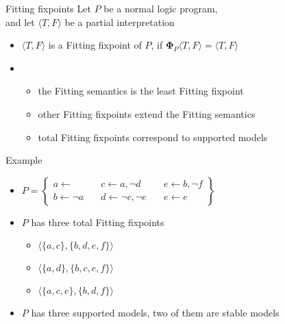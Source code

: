 \begin{frame}{Fitting fixpoints}
  \bigskip
  Let $P$ be a normal logic program,\\ and
  let $\langle T,F \rangle$ be a partial interpretation
  \medskip
  \begin{itemize}
  \item<1->
    $\langle T,F \rangle$ is a \alert{Fitting fixpoint} of $P$,
    if
    ${\mathbf{\Phi}}_P\langle T,F \rangle = \langle T,F \rangle$
  \smallskip
  \item<2-> []
    \begin{itemize}\normalsize
    \item the Fitting semantics is the least Fitting fixpoint
      \smallskip
    \item other Fitting fixpoints extend the Fitting semantics
      \smallskip
    \item total Fitting fixpoints correspond to supported models
    \end{itemize}
  \end{itemize}
\end{frame}
\begin{frame}{Example}
  \bigskip
  \begin{itemize}
  \item<1->
    \(
    P
    =
    \left\{
      \begin{array}{lll}
        a \leftarrow                \quad &
        c \leftarrow a, \neg d      \quad &
        e \leftarrow b, \neg f
        \\
        b \leftarrow \neg a         \quad &
        d \leftarrow \neg c, \neg e \quad &
        e \leftarrow e
      \end{array}
    \right\}
    \)
    \bigskip
  \item<2-> $P$ has three total Fitting fixpoints
    \smallskip
    \begin{itemize}\normalsize
    \item<3-> $\langle \{a,c\},  \{b,d,e,f\} \rangle$
    \item<3-> $\langle \{a,d\},  \{b,c,e,f\} \rangle$
    \item<3-> $\langle \{a,c,e\},\{b,d,f\}   \rangle$
    \end{itemize}
    \medskip
  \item <4-> $P$ has three supported models, two of them are stable models
  \end{itemize}
\end{frame}
